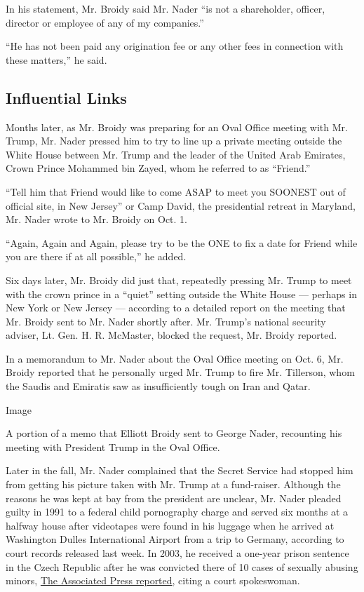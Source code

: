 In his statement, Mr. Broidy said Mr. Nader ``is not a shareholder,
officer, director or employee of any of my companies.''

``He has not been paid any origination fee or any other fees in
connection with these matters,'' he said.

\hypertarget{influential-links}{%
\subsection{Influential Links}\label{influential-links}}

Months later, as Mr. Broidy was preparing for an Oval Office meeting
with Mr. Trump, Mr. Nader pressed him to try to line up a private
meeting outside the White House between Mr. Trump and the leader of the
United Arab Emirates, Crown Prince Mohammed bin Zayed, whom he referred
to as ``Friend.''

``Tell him that Friend would like to come ASAP to meet you SOONEST out
of official site, in New Jersey'' or Camp David, the presidential
retreat in Maryland, Mr. Nader wrote to Mr. Broidy on Oct. 1.

``Again, Again and Again, please try to be the ONE to fix a date for
Friend while you are there if at all possible,'' he added.

Six days later, Mr. Broidy did just that, repeatedly pressing Mr. Trump
to meet with the crown prince in a ``quiet'' setting outside the White
House --- perhaps in New York or New Jersey --- according to a detailed
report on the meeting that Mr. Broidy sent to Mr. Nader shortly after.
Mr. Trump's national security adviser, Lt. Gen. H. R. McMaster, blocked
the request, Mr. Broidy reported.

In a memorandum to Mr. Nader about the Oval Office meeting on Oct. 6,
Mr. Broidy reported that he personally urged Mr. Trump to fire Mr.
Tillerson, whom the Saudis and Emiratis saw as insufficiently tough on
Iran and Qatar.

Image

A portion of a memo that Elliott Broidy sent to George Nader, recounting
his meeting with President Trump in the Oval Office.

Later in the fall, Mr. Nader complained that the Secret Service had
stopped him from getting his picture taken with Mr. Trump at a
fund-raiser. Although the reasons he was kept at bay from the president
are unclear, Mr. Nader pleaded guilty in 1991 to a federal child
pornography charge and served six months at a halfway house after
videotapes were found in his luggage when he arrived at Washington
Dulles International Airport from a trip to Germany, according to court
records released last week. In 2003, he received a one-year prison
sentence in the Czech Republic after he was convicted there of 10 cases
of sexually abusing minors,
\href{http://hosted2.ap.org/PASHA/a5050f4ad4f44dafab85bb41a15281cf/Article_2018-03-15-US-Trump-Russia-Probe/id-93db9ed0b5054340b9acc851355ce56b}{The
Associated Press reported}, citing a court spokeswoman.

